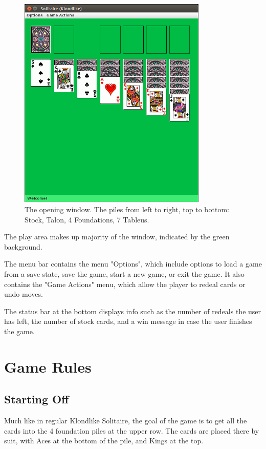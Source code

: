 \documentclass[12pt,a4paper,titlepage]{article}
\begin{document}
	\begin{figure}[H]
		\centering
		\captionsetup{justification=centering}
		\includegraphics[width=9cm]{images/fig1.png}
		\caption{The opening window. The piles from left to right, top to
		bottom: Stock, Talon, 4 Foundations, 7 Tableus.}
		\label{fig:fig1}
	\end{figure}

	The play area makes up majority of the window, indicated by the green
	background.
	
	The menu bar contains the menu "Options", which include
	options to load a game from a save state, save the game, start a new game,
	or exit the game. It also contains the "Game Actions" menu, which allow
	the player to redeal cards or undo moves.

	The status bar at the bottom displays info such as the number of redeals
	the user has left, the number of stock cards, and a win message in case the
	user finishes the game.

	\newpage
	\section{Game Rules}
	\subsection{Starting Off}
	Much like in regular Klondlike Solitaire, the goal of the game is to get all
	the cards into the 4 foundation piles at the upper row. The cards are placed
	there by suit, with Aces at the bottom of the pile, and Kings at the top.
\end{document}
